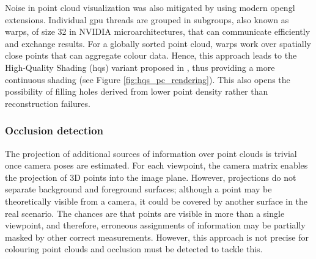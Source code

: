 Noise in point cloud visualization was also mitigated by \cite{schutz_rendering_2019, schutz_rendering_2021} using modern \acrshort{opengl} extensions. Individual \acrshort{gpu} threads are grouped in subgroups, also known as warps, of size 32 in NVIDIA microarchitectures, that can communicate efficiently and exchange results. For a globally sorted point cloud, warps work over spatially close points that can aggregate colour data. Hence, this approach leads to the High-Quality Shading (\acrshort{hqs}) variant proposed in \cite{schutz_rendering_2021}, thus providing a more continuous shading (see Figure \ref{fig:hqs_pc_rendering}). This also opens the possibility of filling holes derived from lower point density rather than reconstruction failures. 

\subsubsection{Occlusion detection}

The projection of additional sources of information over point clouds is trivial once camera poses are estimated. For each viewpoint, the camera matrix enables the projection of 3D points into the image plane. However, projections do not separate background and foreground surfaces; although a point may be theoretically visible from a camera, it could be covered by another surface in the real scenario. The chances are that points are visible in more than a single viewpoint, and therefore, erroneous assignments of information may be partially masked by other correct measurements. However, this approach is not precise for colouring point clouds and occlusion must be detected to tackle this.    

